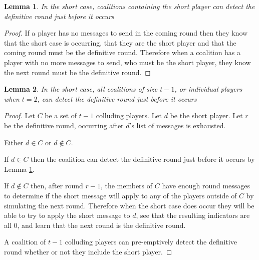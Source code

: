 \documentclass{dalcsthesis}
\newtheorem{lemma}{Lemma}
\begin{document}
\begin{lemma} In the short case, coalitions containing the short player can detect the definitive round just before it occurs \label{Lem:SUIP:ShortPlayerCoalitionsPremptivelyKnowShortRound} \end{lemma}
\begin{proof}
If a player has no messages to send in the coming round then they know that the short case is occurring, that they are the short player and that the coming round must be the definitive round. Therefore when a coalition has a player with no more messages to send, who must be the short player, they know the next round must be the definitive round.
\end{proof}

\begin{lemma} In the short case, all coalitions of size $t-1$, or individual players when $t = 2$, can detect the definitive round just before it occurs \label{Lem:SUIP:MaxSizeCoalitionsPremptivelyKnowShortRound} \end{lemma}
\begin{proof}
Let $C$ be a set of $t-1$ colluding players. Let $d$ be the short player. Let $r$ be the definitive round, occurring after $d$'s list of messages is exhausted.

Either $d \in C$ or $d \notin C$.

If $d \in C$ then the coalition can detect the definitive round just before it occurs by Lemma \ref{Lem:SUIP:ShortPlayerCoalitionsPremptivelyKnowShortRound}.

If $d \notin C$ then, after round $r-1$, the members of $C$ have enough round messages to determine if the short message will apply to any of the players outside of $C$ by simulating the next round. Therefore when the short case does occur they will be able to try to apply the short message to $d$, see that the resulting indicators are all $0$, and learn that the next round is the definitive round.

A coalition of $t-1$ colluding players can pre-emptively detect the definitive round whether or not they include the short player.
\end{proof}
 
\end{document}
